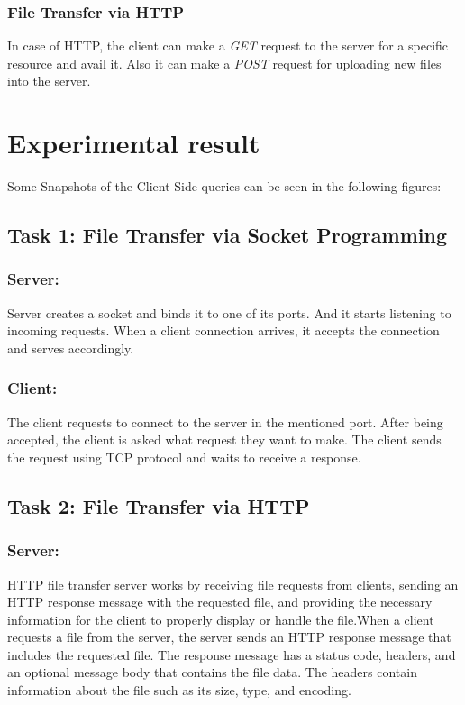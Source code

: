 \documentclass[11pt]{article}
\begin{document}
\subsubsection{File Transfer via HTTP}
In case of HTTP, the client can make a \emph{GET} request to the server for a specific resource and avail it. Also it can make a \emph{POST} request for uploading new files into the server.

\section{Experimental result}

Some Snapshots of the Client Side queries can be seen in the following figures:

\subsection{Task 1: File Transfer via Socket Programming}
\subsubsection{Server:}
Server creates a socket and binds it to one of its ports. And it starts listening to incoming requests. When a client connection arrives, it accepts the connection and serves accordingly.
\subsubsection{Client: }
The client requests to connect to the server in the mentioned port. After being accepted, the client is asked what request they want to make. The client sends the request using TCP protocol and waits to receive a response.
\subsection{Task 2: File Transfer via HTTP}
\subsubsection{Server:}
HTTP file transfer server works by receiving file requests from clients, sending an HTTP response
message with the requested file, and providing the necessary information for the client to properly
display or handle the file.When a client requests a file from the server, the server sends an HTTP
response message that includes the requested file. The response message has a status code, headers,
and an optional message body that contains the file data. The headers contain information about
the file such as its size, type, and encoding.
\end{document}
